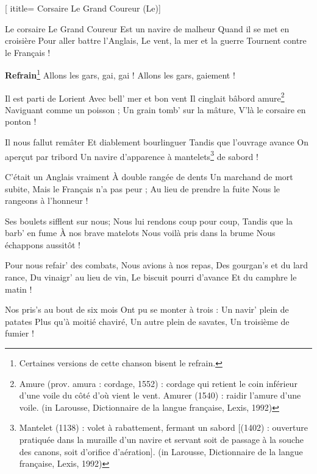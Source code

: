  [
ititle= {Corsaire Le Grand Coureur (Le)}]


\beginverse
Le corsaire Le Grand Coureur
Est un navire de malheur
Quand il se met en croisière
Pour aller battre l'Anglais,
Le vent, la mer et la guerre
Tournent contre le Français !
\endverse

\beginchorus
\textbf {Refrain}\footnote {Certaines versions de cette chanson bisent le refrain.}
Allons les gars, gai, gai !
Allons les gars, gaiement !
\endchorus

\beginverse
Il est parti de Lorient
Avec bell' mer et bon vent
Il cinglait bâbord amure\footnote {Amure (prov. amura : cordage, 1552) : cordage qui retient le coin inférieur d'une voile du côté d'où vient le vent. Amurer (1540) : raidir l'amure d'une voile. (in Larousse, Dictionnaire de la langue française, Lexis, 1992)}
Naviguant comme un poisson ;
Un grain tomb' sur la mâture,
V'là le corsaire en ponton !
\endverse

\beginverse
Il nous fallut remâter
Et diablement bourlinguer
Tandis que l'ouvrage avance
On aperçut par tribord
Un navire d'apparence
à mantelets\footnote {Mantelet (1138) : volet à rabattement, fermant un sabord [(1402) : ouverture pratiquée dans la muraille d'un navire et servant soit de passage à la souche des canons, soit d'orifice d'aération]. (in Larousse, Dictionnaire de la langue française, Lexis, 1992)} de sabord !
\endverse

\beginverse
C'était un Anglais vraiment
À double rangée de dents
Un marchand de mort subite,
Mais le Français n'a pas peur ;
Au lieu de prendre la fuite
Nous le rangeons à l'honneur !
\endverse

\beginverse
Ses boulets sifflent sur nous;
Nous lui rendons coup pour coup,
Tandis que la barb' en fume
À nos brave matelots
Nous voilà pris dans la brume
Nous échappons aussitôt !
\endverse

\beginverse
Pour nous refair' des combats,
Nous avions à nos repas,
Des gourgan's et du lard rance,
Du vinaigr' au lieu de vin,
Le biscuit pourri d'avance
Et du camphre le matin !
\endverse

\beginverse
Nos pris's au bout de six mois
Ont pu se monter à trois :
Un navir' plein de patates
Plus qu'à moitié chaviré,
Un autre plein de savates,
Un troisième de fumier !
\endverse

